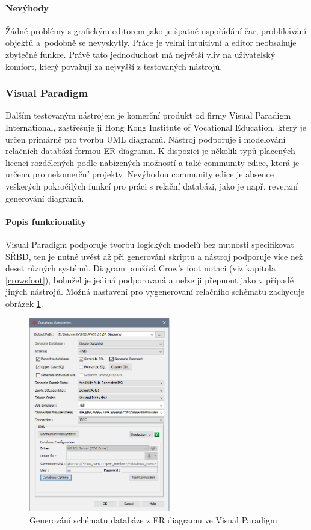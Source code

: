 \documentclass[czech,bachelor,public,dept460,male,oneside]{diploma}
\begin{document}
		\paragraph{Nevýhody}
		Žádné problémy s grafickým editorem jako je špatné uspořádání čar, problikávání objektů a~podobně se nevyskytly. Práce je velmi intuitivní a editor neobsahuje zbytečné funkce. Právě tato jednoduchost má největší vliv na uživatelský komfort, který považuji za nejvyšší z testovaných nástrojů.
		
		\subsubsection{Visual Paradigm}
		Dalším testovaným nástrojem je komerční produkt od firmy Visual Paradigm International, zastřešuje ji Hong Kong Institute of Vocational Education, který je určen primárně pro tvorbu UML diagramů. Nástroj podporuje i modelování relačních databází formou ER diagramu. K dispozici je několik typů placených licencí rozdělených podle nabízených možností a také community edice, která je určena pro nekomerční projekty. Nevýhodou community edice je absence veškerých pokročilých funkcí pro práci s relační databázi, jako je např. reverzní generování diagramů.
		
		\paragraph{Popis funkcionality}
		Visual Paradigm podporuje tvorbu logických modelů bez nutnosti specifikovat SŘBD, ten je nutné uvést až při generování skriptu a nástroj podporuje více než deset různých systémů. Diagram používá Crow's foot notaci (viz kapitola \ref{crowsfoot}), bohužel je jediná podporovaná a nelze ji přepnout jako v případě jiných nástrojů. Možná nastavení pro vygenerovaní relačního schématu zachycuje obrázek \ref{fig:editVP}.
		
		\begin{figure}[H]
			\centering
			\includegraphics[width=0.55\textwidth]{Figures/EditorVP}
			\caption[Generování schématu databáze z ER diagramu ve Visual Paradigm]{Generování schématu databáze z ER diagramu ve Visual Paradigm}
			\label{fig:editVP}
		\end{figure}
		
\end{document}
